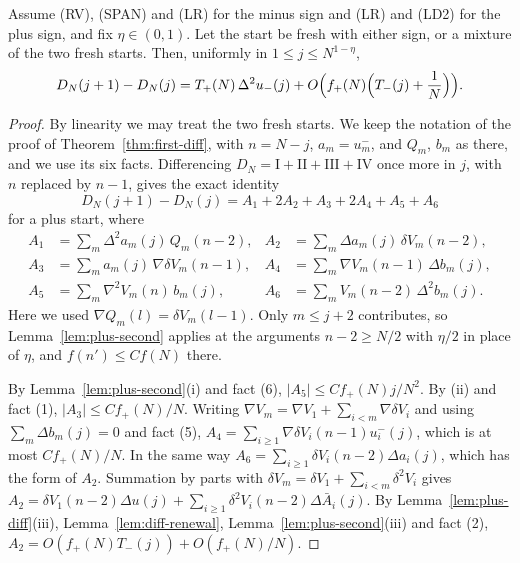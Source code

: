 \begin{theorem}\label{thm:layer-second}
Assume (RV), (SPAN) and (LR) for the minus sign and (LR) and (LD2) for the plus sign, and fix
$\eta\in(0,1)$. Let the start be fresh with either sign, or a mixture of the two fresh starts.
Then, uniformly in $1\le j\le N^{1-\eta}$,
\[
 D_N(j+1)-D_N(j)=T_{+}(N)\,\Delta^2u_{-}(j)+O\Bigl(f_{+}(N)\Bigl(T_{-}(j)+\frac1N\Bigr)\Bigr).
\]
\end{theorem}

\begin{proof}
By linearity we may treat the two fresh starts. We keep the notation of the proof of
Theorem~\ref{thm:first-diff}, with $n=N-j$, $a_m=u^\minus_m$, and $Q_m$, $b_m$ as there, and we
use its six facts. Differencing $D_N=\mathrm I+\mathrm{II}+\mathrm{III}+\mathrm{IV}$ once more in
$j$, with $n$ replaced by $n-1$, gives the exact identity
\[
 D_N(j+1)-D_N(j)=A_1+2A_2+A_3+2A_4+A_5+A_6
\]
for a plus start, where
\begin{align*}
 A_1&=\sum_m\Delta^2a_m(j)\,Q_m(n-2),& A_2&=\sum_m\Delta a_m(j)\,\delta V_m(n-2),\\
 A_3&=\sum_ma_m(j)\,\nabla\delta V_m(n-1),& A_4&=\sum_m\nabla V_m(n-1)\,\Delta b_m(j),\\
 A_5&=\sum_m\nabla^2V_m(n)\,b_m(j),& A_6&=\sum_mV_m(n-2)\,\Delta^2b_m(j).
\end{align*}
Here we used $\nabla Q_m(l)=\delta V_m(l-1)$. Only $m\le j+2$ contributes, so
Lemma~\ref{lem:plus-second} applies at the arguments $n-2\ge N/2$ with $\eta/2$ in place of
$\eta$, and $f(n')\le Cf(N)$ there.

By Lemma~\ref{lem:plus-second}(i) and fact (6), $|A_5|\le Cf_\plus(N)j/N^2$. By (ii) and fact
(1), $|A_3|\le Cf_\plus(N)/N$. Writing $\nabla V_m=\nabla V_1+\sum_{i<m}\nabla\delta V_i$ and using
$\sum_m\Delta b_m(j)=0$ and fact (5), $A_4=\sum_{i\ge1}\nabla\delta V_i(n-1)u^\minus_i(j)$, which
is at most $Cf_\plus(N)/N$. In the same way $A_6=\sum_{i\ge1}\delta V_i(n-2)\Delta a_i(j)$, which
has the form of $A_2$. Summation by parts with $\delta V_m=\delta V_1+\sum_{i<m}\delta^2V_i$ gives
$A_2=\delta V_1(n-2)\Delta u(j)+\sum_{i\ge1}\delta^2V_i(n-2)\Delta\bar A_i(j)$. By
Lemma~\ref{lem:plus-diff}(iii), Lemma~\ref{lem:diff-renewal}, Lemma~\ref{lem:plus-second}(iii)
and fact (2), $A_2=O(f_\plus(N)T_\minus(j))+O(f_\plus(N)/N)$.


\end{proof}
